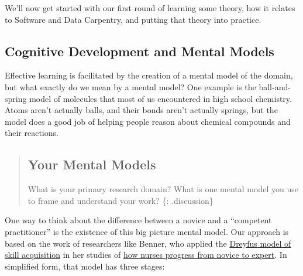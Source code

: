 
We'll now get started with our first round of learning some theory, how
it relates to Software and Data Carpentry, and putting that theory into
practice.

\subsection{Cognitive Development and Mental
Models}\label{cognitive-development-and-mental-models}

Effective learning is facilitated by the creation of a mental model of
the domain, but what exactly do we mean by a mental model? One example
is the ball-and-spring model of molecules that most of us encountered in
high school chemistry. Atoms aren't actually balls, and their bonds
aren't actually springs, but the model does a good job of helping people
reason about chemical compounds and their reactions.

\begin{quote}
\subsection{Your Mental Models}\label{your-mental-models}

What is your primary research domain? What is one mental model you use
to frame and understand your work? \{: .discussion\}
\end{quote}

One way to think about the difference between a novice and a ``competent
practitioner'' is the existence of this big picture mental model. Our
approach is based on the work of researchers like Benner, who applied
the
\href{https://en.wikipedia.org/wiki/Dreyfus_model_of_skill_acquisition}{Dreyfus
model of skill acquisition} in her studies of
\href{http://www.amazon.com/Novice-Expert-Excellence-Clinical-Practice/dp/020100299X/}{how
nurses progress from novice to expert}. In simplified form, that model
has three stages:

